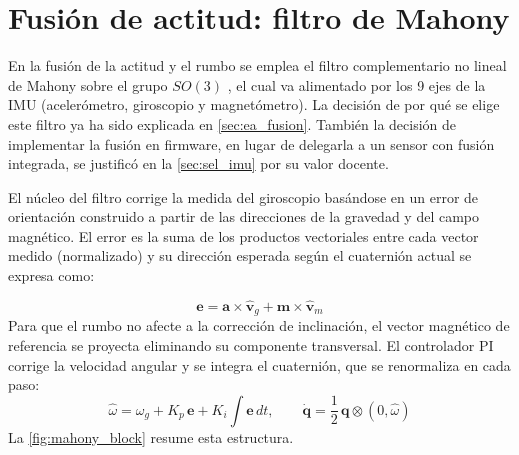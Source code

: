 \section{Fusión de actitud: filtro de Mahony}
\label{sec:fw_fusion}

En la fusión de la actitud y el rumbo se emplea el filtro complementario no lineal de Mahony sobre el grupo $SO(3)$ \cite{mahony2008}, el cual va alimentado por los 9 ejes de la IMU (acelerómetro, giroscopio y magnetómetro). La decisión de por qué se elige este filtro ya ha sido explicada en \cref{sec:ea_fusion}. También la decisión de implementar la fusión en firmware, en lugar de delegarla a un sensor con fusión integrada, se justificó en la \cref{sec:sel_imu} por su valor docente.

El núcleo del filtro corrige la medida del giroscopio basándose en un error de
orientación construido a partir de las direcciones de la gravedad y del campo
magnético. El error es la suma de los productos vectoriales entre cada vector
medido (normalizado) y su dirección esperada según el cuaternión actual se expresa como:

\begin{equation}
    \mathbf{e} = \mathbf{a}\times\hat{\mathbf{v}}_g + \mathbf{m}\times\hat{\mathbf{v}}_m
\end{equation}
Para que el rumbo no afecte a la corrección de inclinación, el vector magnético de referencia se
proyecta eliminando su componente transversal. El controlador PI corrige la velocidad angular
y se integra el cuaternión, que se renormaliza en cada paso:
\begin{equation}
    \hat{\omega} = \omega_g + K_p\,\mathbf{e} + K_i\!\int \mathbf{e}\,dt,
    \qquad
    \dot{\mathbf{q}} = \frac{1}{2}\,\mathbf{q}\otimes(0,\hat{\omega})
\end{equation}
La \cref{fig:mahony_block} resume esta estructura.


